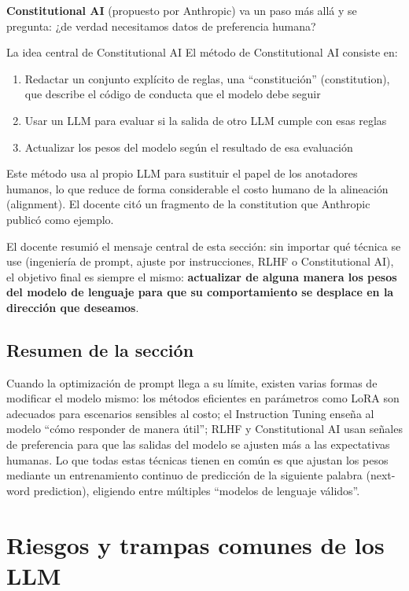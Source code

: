 \documentclass[a4paper]{article}
\begin{document}
\textbf{Constitutional AI} (propuesto por Anthropic) va un paso más allá y se pregunta: ¿de verdad necesitamos datos de preferencia humana?

\begin{knowledgebox}{La idea central de Constitutional AI}
El método de Constitutional AI consiste en:
\begin{enumerate}
    \item Redactar un conjunto explícito de reglas, una ``constitución'' (constitution), que describe el código de conducta que el modelo debe seguir
    \item Usar un LLM para evaluar si la salida de otro LLM cumple con esas reglas
    \item Actualizar los pesos del modelo según el resultado de esa evaluación
\end{enumerate}
Este método usa al propio LLM para sustituir el papel de los anotadores humanos, lo que reduce de forma considerable el costo humano de la alineación (alignment). El docente citó un fragmento de la constitution que Anthropic publicó como ejemplo.
\end{knowledgebox}

El docente resumió el mensaje central de esta sección: sin importar qué técnica se use (ingeniería de prompt, ajuste por instrucciones, RLHF o Constitutional AI), el objetivo final es siempre el mismo: \textbf{actualizar de alguna manera los pesos del modelo de lenguaje para que su comportamiento se desplace en la dirección que deseamos}.

\subsection{Resumen de la sección}

Cuando la optimización de prompt llega a su límite, existen varias formas de modificar el modelo mismo: los métodos eficientes en parámetros como LoRA son adecuados para escenarios sensibles al costo; el Instruction Tuning enseña al modelo ``cómo responder de manera útil''; RLHF y Constitutional AI usan señales de preferencia para que las salidas del modelo se ajusten más a las expectativas humanas. Lo que todas estas técnicas tienen en común es que ajustan los pesos mediante un entrenamiento continuo de predicción de la siguiente palabra (next-word prediction), eligiendo entre múltiples ``modelos de lenguaje válidos''.

\section{Riesgos y trampas comunes de los LLM}
\end{document}
